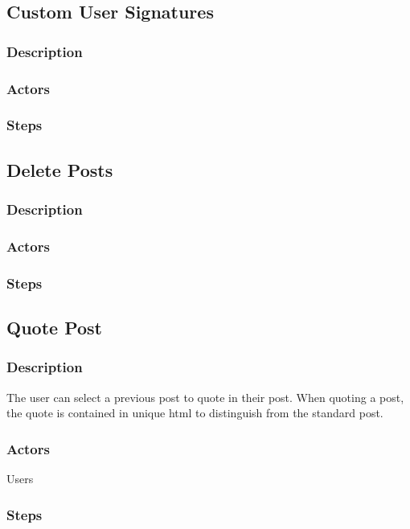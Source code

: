 \documentclass[12pt]{scrartcl}
\begin{document}
\subsection{Custom User Signatures}
\subsubsection{Description}
\subsubsection{Actors}
\subsubsection{Steps}

\subsection{Delete Posts}
\subsubsection{Description}
\subsubsection{Actors}
\subsubsection{Steps}

\subsection{Quote Post}
\subsubsection{Description}

The user can select a previous post to quote in their post. When quoting a post, the quote is contained in unique html to distinguish from the standard post. 
\subsubsection{Actors}

Users

\subsubsection{Steps}
\end{document}
